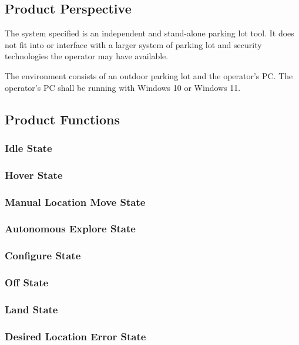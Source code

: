 \documentclass{article}
\begin{document}
\subsection{Product Perspective}
The system specified is an independent and stand-alone parking lot tool. It does not fit into or interface with a larger system of parking lot and security technologies the operator may have available. 

The environment consists of an outdoor parking lot and the operator's PC. The operator's PC shall be running with Windows 10 or Windows 11.

\subsection{Product Functions}
\label{subsec:ProdFunc}

\subsubsection{Idle State}
\label{Idle State}
\subsubsection{Hover State}
\label{Hover State}
\subsubsection{Manual Location Move State}
\label{Manual Location Move State}
\subsubsection{Autonomous Explore State}
\label{Autonomous Explore State}
\subsubsection{Configure State}
\label{Configure State}
\subsubsection{Off State}
\label{Off State}
\subsubsection{Land State}
\label{Land State}
\subsubsection{Desired Location Error State}
\label{Desired Location Error State}
\end{document}
